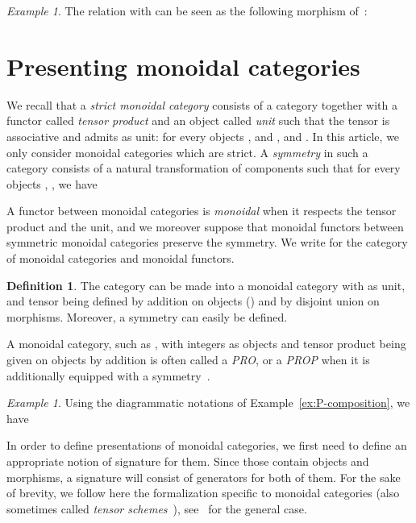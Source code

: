 \documentclass[submission,copyright,creativecommons]{eptcs}
\theoremstyle{definition}
\newtheorem{definition}[theorem]{Definition}
\theoremstyle{remark}
\newtheorem{example}[theorem]{Example}
\begin{document}
\begin{example}
  \label{ex:rel-P}
  The relation  with  can be seen as
  the following morphism of~:
  
\end{example}

\section{Presenting monoidal categories}
\label{sec:presenting}
We recall that a \emph{strict monoidal category}  consists of a
category  together with a functor  called
\emph{tensor product} and an object  called \emph{unit} such that the
tensor is associative and admits  as unit: for every objects ,  and
,  and . In this article, we only consider monoidal categories which are strict. A
\emph{symmetry} in such a category consists of a natural transformation of
components  such that for every objects
, ,  we have

A functor between monoidal categories is \emph{monoidal} when it respects the
tensor product and the unit, and we moreover suppose that monoidal functors
between symmetric monoidal categories preserve the symmetry. We write 
for the category of monoidal categories and monoidal functors.

\begin{definition}
  \label{def:P-monoidal}
  The category  can be made into a monoidal category with  as unit, and
  tensor being defined by addition on objects () and by disjoint
  union on morphisms. Moreover, a symmetry can easily be defined.
\end{definition}

\noindent
A monoidal category, such as , with integers as objects and tensor product
being given on objects by addition is often called a \emph{PRO}, or a
\emph{PROP} when it is additionally equipped with a
symmetry~\cite{maclane1965categorical}.

\begin{example}
  Using the diagrammatic notations of Example~\ref{ex:P-composition}, we have
  
\end{example}

In order to define presentations of monoidal categories, we first need to define
an appropriate notion of signature for them. Since those contain objects and
morphisms, a signature will consist of generators for both of them. For the sake
of brevity, we follow here the formalization specific to monoidal categories
(also sometimes called \emph{tensor schemes}~\cite{joyal1991geometry}),
see~\cite{burroni1993higher} for the general case.
\end{document}
